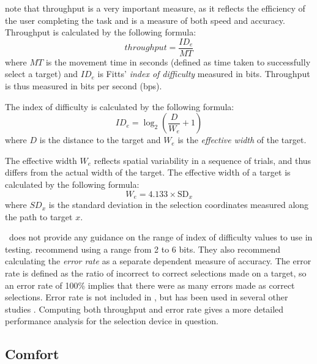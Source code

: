 \documentclass{elsart}
\begin{document}
\citet{Mack-IS-2001-EHCI} note that throughput
is a very important measure, as it reflects the efficiency of the user
completing the task and is a measure of both speed and
accuracy. Throughput is calculated by the following formula:
\begin{equation}
	\label{eqn-throughput}
	\mathit{throughput} = \frac{\mathit{ID}_{e}}{\mathit{MT}}
\end{equation}
where \(\mathit{MT}\) is the movement time in seconds (defined as time
taken to successfully select a target) and \(\mathit{ID}_{e}\) is Fitts'
\citeyearpar{Fitt-PM-1954-Law} \emph{index of difficulty} measured in
bits. Throughput is thus measured in bits per second (bps).

The index of difficulty is calculated by the following formula:
\begin{equation}
	\label{eqn-IDe}
	\mathit{ID}_{e} = \log_{2}\left(\frac{D}{W_{e}} + 1\right)
\end{equation}
where \(D\) is the distance to the target and \(W_{e}\) is the
\emph{effective width} of the target.

The effective width \(W_{e}\) reflects spatial variability in a sequence
of trials, and thus differs from the actual width of the target. The
effective width of a target is calculated by the following formula:
\begin{equation}
	\label{eqn-We}
	W_{e} = 4.133 \times \mathrm{SD}_{x}
\end{equation}
where \(\mathit{SD}_{x}\) is the standard deviation in the selection
coordinates measured along the path to target \(x\).

\ISOnine\ does not provide any guidance on the range of index of
difficulty values to use in testing. \citet{Doug-SA-1999-CHI} recommend
using a range from 2 to 6 bits. They also recommend calculating the
\emph{error rate} as a separate dependent measure of accuracy. The
error rate is defined as the ratio of incorrect to correct selections
made on a target, so an error rate of 100\% implies that there were as
many errors made as correct selections. Error rate is not included in
\ISOnine, but has been used in several other studies
\citep{Sear-A-1991-IJMMS,Sear-A-1993-BIT,Hara-H-1996,Bend-G-1999-PhD,
Doug-SA-1999-CHI,Mack-IS-2001-EHCI,Po-BA-2004-CHI}. Computing both
throughput and error rate gives a more detailed performance analysis for
the selection device in question.


\subsection{Comfort}
\label{sec-evaluation-comfort}
\end{document}
